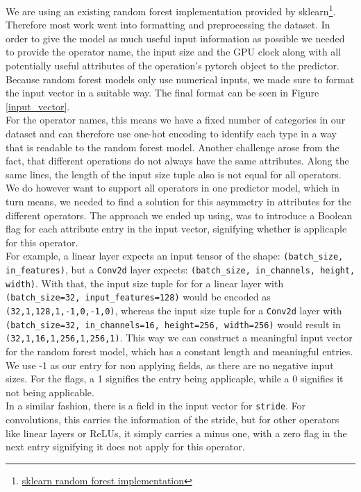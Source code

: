 We are using an existing random forest implementation provided by sklearn\footnote{\href{https://scikit-learn.org/stable/modules/generated/sklearn.ensemble.RandomForestRegressor.html}{sklearn random forest implementation} }. Therefore most work went into formatting and preprocessing the dataset. In order to give the model as much useful input information as possible we needed to provide the operator name, the input size and the GPU clock along with all potentially useful attributes of the operation's pytorch object to the predictor. \\
Because random forest models only use numerical inputs, we made sure to format the input vector in a suitable way. The final format can be seen in Figure \ref{input_vector}.\\
For the operator names, this means we have a fixed number of categories in our dataset and can therefore use one-hot encoding to identify each type in a way that is readable to the random forest model. Another challenge arose from the fact, that different operations do not always have the same attributes. Along the same lines, the length of the input size tuple also is not equal for all operators. We do however want to support all operators in one predictor model, which in turn means, we needed to find a solution for this asymmetry in attributes for the different operators. The approach we ended up using, was to introduce a Boolean flag for each attribute entry in the input vector, signifying whether is applicaple for this operator.\\
For example, a linear layer expects an input tensor of the shape: \texttt{(batch\_size, in\_features)}, but a \texttt{Conv2d} layer expects: \texttt{(batch\_size, in\_channels, height, width)}. With that, the input size tuple for for a linear layer with \texttt{(batch\_size=32, input\_features=128)} would be encoded as \texttt{(32,1,128,1,-1,0,-1,0)}, whereas the input size tuple for a \texttt{Conv2d} layer with \texttt{(batch\_size=32, in\_channels=16, height=256, width=256)} would result in \texttt{(32,1,16,1,256,1,256,1)}. This way we can construct a meaningful input vector for the random forest model, which has a constant length and meaningful entries. We use -1 as our entry for non applying fields, as there are no negative input sizes. For the flags, a 1 signifies the entry being applicaple, while a 0 signifies it not being applicable.\\
In a similar fashion, there is a field in the input vector for \texttt{stride}. For convolutions, this carries the information of the stride, but for other operators like  linear layers or ReLUs, it simply carries a minus one, with a zero flag in the next entry signifying it does not apply for this operator. \\
